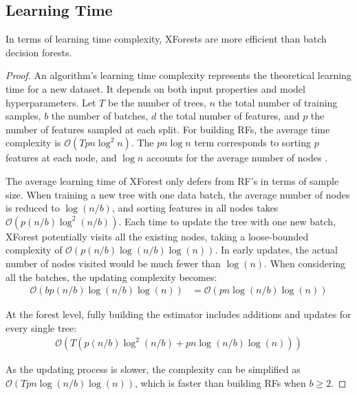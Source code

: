 \subsection{Learning Time}
\label{theory:time}
\begin{lemma}
In terms of learning time complexity, XForests are more efficient than batch decision forests.
\end{lemma}
\begin{proof}
An algorithm's learning time complexity represents the theoretical learning time for a new dataset. It depends on both input properties and model hyperparameters. Let $T$ be the number of trees, $n$ the total number of training samples, $b$ the number of batches, $d$ the total number of features, and $p$ the number of features sampled at each split. For building RFs, the average time complexity is $\mathcal{O}(Tpn\log^2{n})$. The $pn\log{n}$ term corresponds to sorting $p$ features at each node, and $\log{n}$ accounts for the average number of nodes \citep{louppe_understanding_2015}. 

The average learning time of XForest only defers from RF's in terms of sample size. When training a new tree with one data batch, the average number of nodes is reduced to $\log(n/b)$, and sorting features in all nodes takes $\mathcal{O}(p(n/b)\log^2(n/b))$. Each time to update the tree with one new batch, XForest potentially visits all the existing nodes, taking a loose-bounded complexity of $\mathcal{O}(p(n/b)\log(n/b)\log(n))$. In early updates, the actual number of nodes visited would be much fewer than $\log(n)$. When considering all the batches, the updating complexity becomes:
\begin{align*}
    \mathcal{O}(bp(n/b)\log(n/b)\log(n))
    &= \mathcal{O}(pn\log(n/b)\log(n))
\end{align*}

At the forest level, fully building the estimator includes additions and updates for every single tree: 
\begin{align*}
    \mathcal{O}(T(p(n/b)\log^2{(n/b)} + pn\log(n/b)\log(n)))
\end{align*}

As the updating process is slower, the complexity can be simplified as $\mathcal{O}(Tpn\log(n/b)\log(n))$, which is faster than building RFs when $b \geq 2$.
\end{proof}

